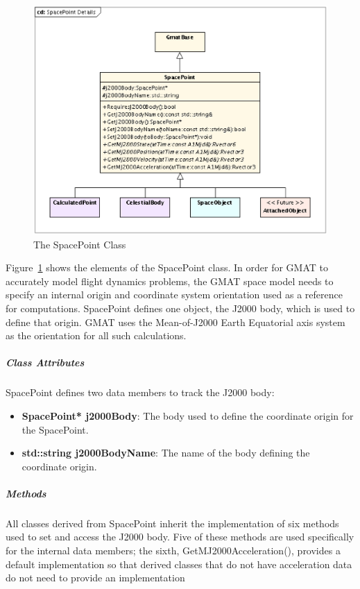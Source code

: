 \begin{figure}[htb]
\begin{center}
\includegraphics[scale=0.5]{Images/SpacePointDetails.eps}
\caption{\label{figure:SpacePointDetails}The SpacePoint Class}
\end{center}
\end{figure}

Figure~\ref{figure:SpacePointDetails} shows the elements of the SpacePoint class.  In
order for GMAT to accurately model flight dynamics problems, the GMAT space model needs to specify
an internal origin and coordinate system orientation used as a reference for computations.
SpacePoint defines one object, the J2000 body, which is used to define that origin.  GMAT uses the
Mean-of-J2000 Earth Equatorial axis system as the orientation for all such calculations.

\subparagraph{\textit{Class Attributes}}

SpacePoint defines two data members to track the J2000 body:

\begin{itemize}
\item \textbf{SpacePoint* j2000Body}: The body used to define the coordinate origin for the
SpacePoint.
\item \textbf{std::string j2000BodyName}: The name of the body defining the coordinate origin.
\end{itemize}

\subparagraph{\textit{Methods}}

All classes derived from SpacePoint inherit the implementation of six methods used to set and access
the J2000 body.  Five of these methods are used specifically for the internal data members; the
sixth, GetMJ2000Acceleration(), provides a default implementation so that derived classes that do
not have acceleration data do not need to provide an implementation


